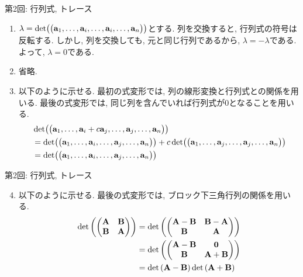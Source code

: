 \documentclass[dvipdfmx,notheorems,t]{beamer}
\begin{document}
\begin{frame}{第2回: 行列式, トレース}
\begin{enumerate}
  \item $\lambda = \det(\mqty(\vb{a}_1, \ldots, \vb{a}_i, \ldots, \vb{a}_i, \ldots, \vb{a}_n))$とする.
  列を交換すると, 行列式の符号は反転する.
  しかし, 列を交換しても, 元と同じ行列であるから, $\lambda = -\lambda$である.
  よって, $\lambda = 0$である.
  \item 省略.
  \item 以下のように示せる.
  最初の式変形では, 列の線形変換と行列式との関係を用いる.
  最後の式変形では, 同じ列を含んでいれば行列式が$0$となることを用いる.
  {\small \begin{align*}
    & \det(\mqty(\vb{a}_1, \ldots, \vb{a}_i + c \vb{a}_j, \ldots, \vb{a}_j, \ldots, \vb{a}_n)) \\
    &= \det(\mqty(\vb{a}_1, \ldots, \vb{a}_i, \ldots, \vb{a}_j, \ldots, \vb{a}_n))
      + c \det(\mqty(\vb{a}_1, \ldots, \vb{a}_j, \ldots, \vb{a}_j, \ldots, \vb{a}_n)) \\
    &= \det(\mqty(\vb{a}_1, \ldots, \vb{a}_i, \ldots, \vb{a}_j, \ldots, \vb{a}_n))
  \end{align*}}
\end{enumerate}
\end{frame}

\begin{frame}{第2回: 行列式, トレース}
\begin{enumerate}
  \setcounter{enumi}{3}
  \item 以下のように示せる.
  最後の式変形では, ブロック下三角行列の関係を用いる.
  \begin{align*}
    \det\left( \mqty(\vb{A} & \vb{B} \\ \vb{B} & \vb{A}) \right)
      &= \det\left( \mqty(\vb{A} - \vb{B} & \vb{B} - \vb{A} \\ \vb{B} & \vb{A}) \right) \\
      &= \det\left( \mqty(\vb{A} - \vb{B} & \vb{0} \\ \vb{B} & \vb{A} + \vb{B}) \right) \\
      &= \det\left( \vb{A} - \vb{B} \right) \det\left( \vb{A} + \vb{B} \right)
  \end{align*}
\end{enumerate}
\end{frame}
\end{document}
